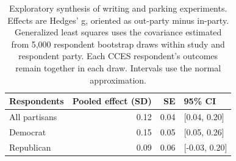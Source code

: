\begin{table}[ht]
\centering
\caption{Exploratory synthesis of writing and parking experiments. Effects are Hedges' g, oriented as out-party minus in-party. Generalized least squares uses the covariance estimated from 5,000 respondent bootstrap draws within study and respondent party. Each CCES respondent's outcomes remain together in each draw. Intervals use the normal approximation.}
\label{tab:pooled_experiments}
\begin{tabular}{lrrl}
  \toprule
Respondents & Pooled effect (SD) & SE & 95\% CI \\
  \midrule
All partisans & 0.12 & 0.04 & [0.04, 0.20] \\
  Democrat & 0.15 & 0.05 & [0.05, 0.26] \\
  Republican & 0.09 & 0.06 & [-0.03, 0.20] \\
   \bottomrule
\end{tabular}
\end{table}
